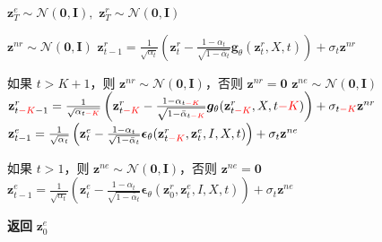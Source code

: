 \begin{algorithm*}[!ht]
  \caption{异步双流扩散模型 $\bm{\epsilon}_{\theta}$ 的推理}
  \label{alg:sampling}
  \label{alg:test}
  \small
  \begin{algorithmic}[1]
    \vspace{.04in}
    \State $  \textbf{z}_T^e \sim \mathcal{N}(\mathbf{0}, \mathbf{I}), $ $  \textbf{z}_T^r \sim \mathcal{N}(\mathbf{0}, \mathbf{I})  $

      \State $\textbf{z}^{nr} \sim \mathcal{N}(\mathbf{0}, \mathbf{I})$
      \State $\textbf{z}^r_{t-1} = \frac{1}{\sqrt{\alpha_t}}\left( \textbf{z}^r_{t} - \frac{1-\alpha_t}{\sqrt{1-\bar{\alpha}_t}} \bm{g}_\theta(\textbf{z}^r_{t}, X,t) \right) + \sigma_t \textbf{z}^{nr}$
    \EndFor

      \State 如果 $t > K+1$，则 $\textbf{z}^{nr} \sim \mathcal{N}(\mathbf{0}, \mathbf{I})$，否则 $\textbf{z}^{nr} = \mathbf{0}$
      \State $\textbf{z}^{ne} \sim \mathcal{N}(\mathbf{0}, \mathbf{I})$
      \State $\textbf{z}^r_{t\textcolor{red}{-K}-1} = \frac{1}{\sqrt{\alpha_{t\textcolor{red}{-K}}}}\left( \textbf{z}^r_{t\textcolor{red}{-K}} - \frac{1-\alpha_{t\textcolor{red}{-K}}}{\sqrt{1-\bar{\alpha}_{t\textcolor{red}{-K}}}} \bm{g}_\theta(\textbf{z}^r_{t\textcolor{red}{-K}}, X,t\textcolor{red}{-K}) \right) + \sigma_{t\textcolor{red}{-K}} \textbf{z}^{nr}$
      \State $\textbf{z}^e_{t-1} = \frac{1}{\sqrt{\alpha_t}}\left( \textbf{z}^e_{t} - \frac{1-\alpha_t}{\sqrt{1-\bar{\alpha}_t}} \bm{\epsilon}_\theta(\textbf{z}^r_{t\textcolor{red}{-K}}, \textbf{z}^e_{t}, I,X,t) \right) + \sigma_t \textbf{z}^{ne}$
    \EndFor

      \State 如果 $t > 1$，则 $\textbf{z}^{ne} \sim \mathcal{N}(\mathbf{0}, \mathbf{I})$，否则 $\textbf{z}^{ne} = \mathbf{0}$
      \State $\textbf{z}^e_{t-1} = \frac{1}{\sqrt{\alpha_t}}\left( \textbf{z}^e_{t} - \frac{1-\alpha_t}{\sqrt{1-\bar{\alpha}_t}} \bm{\epsilon}_\theta(\textbf{z}^r_0, \textbf{z}^e_{t}, I,X,t) \right) + \sigma_t \textbf{z}^{ne}$  

    \EndFor

    \State \textbf{返回} $\textbf{z}^e_0$
    \vspace{.04in}
  \end{algorithmic}
\end{algorithm*}

